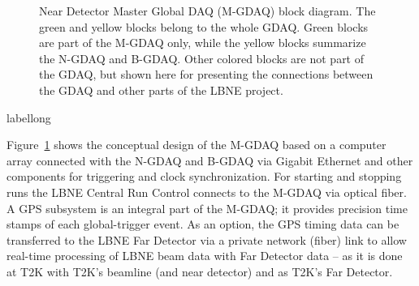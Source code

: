 \begin{figure}[htp]
\begin{center}
\caption[Near Detector Master Global DAQ (M-GDAQ) block diagram]{\label{fig:GDAQ_M_Block} Near 
Detector Master Global DAQ (M-GDAQ) block diagram. 
The green and yellow blocks belong to the whole GDAQ.  Green blocks are
part of the M-GDAQ only, while the yellow blocks summarize the N-GDAQ and B-GDAQ.  Other colored blocks are not
part of the GDAQ, but shown here for presenting the connections between
the GDAQ and other parts of the LBNE project.}
\end{center}
\end{figure}
\begin{cdrfigure}[short]{label}{long}
\end{cdrfigure}
Figure~\ref{fig:GDAQ_M_Block} shows the conceptual design of the M-GDAQ 
based on a computer array connected with the N-GDAQ and B-GDAQ via 
Gigabit Ethernet and other components for triggering and clock 
synchronization. For starting and stopping runs the LBNE Central Run Control 
connects to the M-GDAQ via optical fiber. A GPS subsystem is an 
integral part of the M-GDAQ; it provides precision time stamps of each 
global-trigger event.  As an option, the GPS timing data can be 
transferred to the LBNE Far Detector via a private network (fiber) link 
to allow real-time processing of LBNE beam data with Far Detector data -- 
as it is done at T2K with T2K's beamline (and near detector) and \superk
as T2K's Far Detector. 

